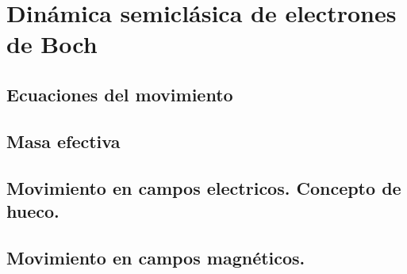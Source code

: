 \chapter{Dinámica semiclásica de electrones de Boch} \label{Ch:08}

\section{Ecuaciones del movimiento}
\section{Masa efectiva}
\section{Movimiento en campos electricos. Concepto de hueco.}
\section{Movimiento en campos magnéticos.}

